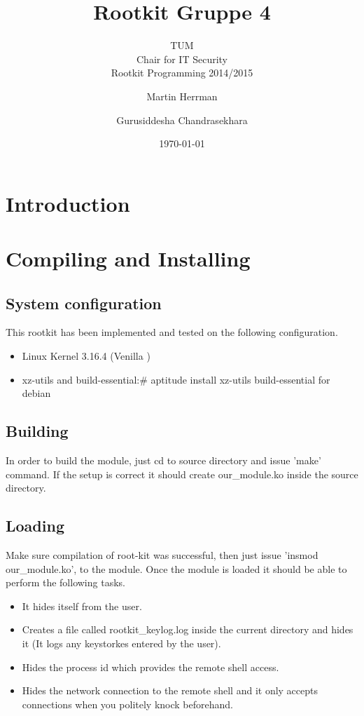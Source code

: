 \documentclass[10pt, letterpaper]{scrartcl}
\title{Rootkit Gruppe 4}
\subtitle{TUM \\Chair for IT Security\\  Rootkit Programming 2014/2015}
\author{Martin Herrman \and Gurusiddesha Chandrasekhara}
\date{\today}
\begin{document}
\maketitle
\tableofcontents
\newpage

\section{Introduction}
\section{Compiling and Installing}
\subsection{System configuration}
This rootkit has been implemented and tested on the following configuration.
\begin{itemize}
    \item Linux Kernel 3.16.4 (Venilla )
    \item xz-utils and build-essential:\# aptitude install xz-utils build-essential for debian 
\end{itemize}

\subsection{Building}
        In order to build the module, just cd to source directory and issue 'make' command. 
	If the setup is correct it should create our\_module.ko inside the source directory. 

\subsection{Loading}
        Make sure compilation of root-kit was successful, then just issue 'insmod our\_module.ko', to the module. 
	Once the module is loaded it should be able to perform the following tasks. 
    
\begin{itemize}
    \item It hides itself from the user. 
    \item Creates a  file called rootkit\_keylog.log inside the current directory and hides it (It logs any keystorkes entered by the user).
    \item Hides the process id which provides the remote shell access. 
    \item Hides the network connection to the remote shell and it only accepts connections when you politely knock beforehand.
    \end{itemize}
\end{document}
